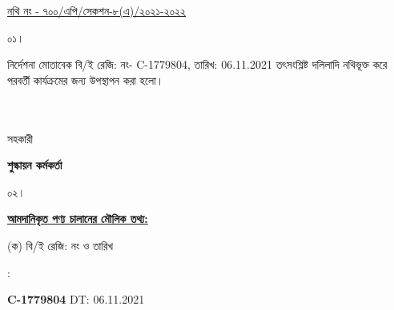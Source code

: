 \documentclass[12pt]{article}
\newcommand{\fileno}{নথি নং - ৭০০/এপি/সেকশন-৮(এ)/২০২১-২০২২}
\newcommand{\filenou}{
\begin{minipage}[t]{0.57\linewidth}
\hspace{1em}
\end{minipage}
\begin{minipage}[t]{0.43\linewidth}
\underline{\fileno}
\end{minipage}
}
\newcommand{\beno}{C-1779804}
\newcommand{\bedt}{06.11.2021}
\begin{document}
{\filenou}
\begin{minipage}[t]{0.05\linewidth}
০১।
\end{minipage}
\begin{minipage}[t]{0.95\linewidth}
নির্দেশনা মোতাবেক বি/ই রেজি: নং- {\beno}, তারিখ: {\bedt}
তৎসংশ্লিষ্ট দলিলাদি নথিভূক্ত করে
পরবর্তী কার্যক্রমের জন্য উপস্থাপন করা হলো।
\\
\\
\\
\end{minipage}
\begin{minipage}[t]{0.05\linewidth}
\hspace*{1em}
\end{minipage}
\begin{minipage}[t]{0.05\linewidth}
সহকারী
\end{minipage}
\begin{minipage}[t]{0.40\linewidth}
\hspace{1em}
\end{minipage}
\begin{minipage}[t]{0.50\linewidth}
\textbf{শুল্কায়ন কর্মকর্তা}
\\
\end{minipage}
\begin{minipage}[t]{0.05\linewidth}
০২।
\end{minipage}
\begin{minipage}[t]{0.95\linewidth}
\underline{\textbf {আমদানিকৃত পণ্য চালানের
মৌলিক তথ্য:}}
\\
\end{minipage}
\footnotesize
\begin{minipage}[t]{0.05\linewidth}
\hspace*{1em}
\end{minipage}
\begin{minipage}[t]{0.45\linewidth}
(ক) বি/ই রেজি: নং ও তারিখ
\end{minipage}
\begin{minipage}[t]{0.02\linewidth}
:
\end{minipage}
\begin{minipage}[t]{0.50\linewidth}
\textbf{{\beno}} \hspace{2em} DT: {\bedt}
\\
\end{minipage}
\begin{minipage}[t]{0.05\linewidth}
\hspace*{1em}
\end{minipage}
\begin{minipage}[t]{0.45\linewidth}
\end{minipage}
\end{document}
